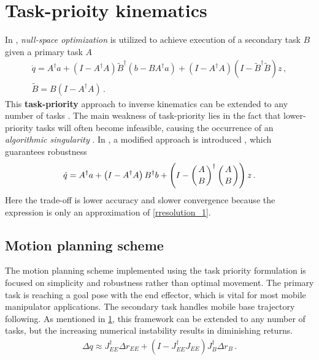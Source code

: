 \documentclass[times, utf8, diplomski, english]{fer}
\begin{document}
\section{Task-prioity kinematics}\label{section:task priority}
In \citep{nakamura1987task,nakamura1990advanced}, \textit{null-space optimization} is utilized to achieve execution of a secondary task $B$ given a primary task $A$
\begin{subequations}
\begin{gather}
\label{rresolution_1}
\dot{q}  = A^{\dagger}a + \left(I - A^{\dagger}A\right)\tilde{B}^{\dagger}\left(b - BA^{\dagger}a\right) + 
\left(I - A^{\dagger}A\right) \left(I - \tilde{B}^{\dagger}\tilde{B}\right)z\, ,\\
\tilde{B}  = B\left(I - A^{\dagger}A\right)\, .
\end{gather}
\end{subequations}
This \textbf{task-priority} approach to inverse kinematics can be extended to any number of tasks \citep{slotine1991general}.
The main weakness of task-priority lies in the fact that lower-priority tasks will often become infeasible, causing the occurrence of an \textit{algorithmic singularity} \citep{baillieul1985kinematic}.
In \citep{chiaverini1997singularity}, a modified approach is introduced , which guarantees robustness 
\begin{align}
\label{rresolution_2}
\dot{q} = A^{\dagger}a + \left(I - A^{\dagger}A\right)B^{\dagger}b + 
\left(I - \left(A \atop B\right)^{\dagger}\left(A \atop B\right)\right)z\, .
\end{align}
Here the trade-off is lower accuracy and slower convergence because the expression is only an approximation of \eqref{rresolution_1}.
\subsection{Motion planning scheme}
The motion planning scheme implemented using the task priority formulation is focused on simplicity and robustness rather than optimal movement.
The primary task is reaching a goal pose with the end effector, which is vital for most mobile manipulator applications. 
The secondary task handles mobile base trajectory following.
As mentioned in \ref{section:task priority}, this framework can be extended to any number of tasks, but the increasing numerical instability results in diminishing returns.
\begin{align}
\label{rresolution_3}
\Delta q \approx J_{EE}^{\dagger}\Delta r_{EE} + \left(I - J_{EE}^{\dagger}J_{EE}\right)J_{B}^{\dagger}\Delta r_{B}\, .
\end{align}
\end{document}
